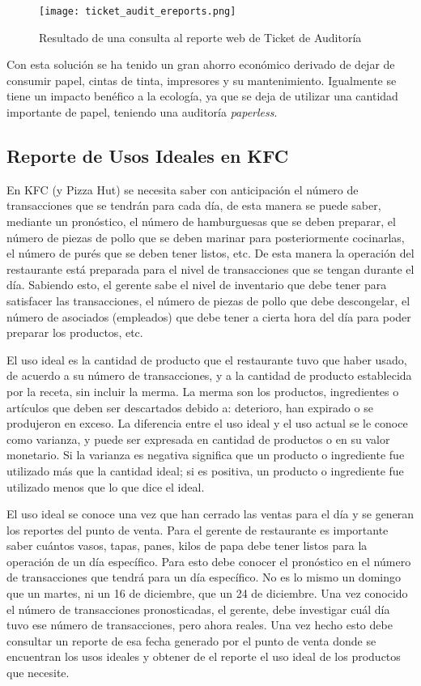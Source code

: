 \begin{figure}[htb]
 \begin{center}
  \texttt{[image: ticket\_audit\_ereports.png]}
 \end{center}
 \caption{Resultado de una consulta al reporte web de Ticket de Auditoría}
 \label{fig:rep_audit_ereports}
\end{figure}

Con esta solución se ha tenido un gran ahorro económico derivado de dejar de consumir papel, cintas de tinta, impresores y su mantenimiento. Igualmente se tiene un impacto benéfico a la ecología, ya que se deja de utilizar una cantidad importante de papel, teniendo una auditoría \textit{paperless}.

\subsection{Reporte de Usos Ideales en KFC}
\label{sec:usos_ideales_kfc}

En KFC (y Pizza Hut) se necesita saber con anticipación el número de transacciones que se tendrán para cada día, de esta manera se puede saber, mediante un pronóstico, el número de hamburguesas que se deben preparar, el número de piezas de pollo que se deben marinar para posteriormente cocinarlas, el número de purés que se deben tener listos, etc. De esta manera la operación del restaurante está preparada para el nivel de transacciones que se tengan durante el día. Sabiendo esto, el gerente sabe el nivel de inventario que debe tener para satisfacer las transacciones, el número de piezas de pollo que debe descongelar, el número de asociados (empleados) que debe tener a cierta hora del día para poder preparar los productos, etc. 

El uso ideal es la cantidad de producto que el restaurante tuvo que haber usado, de acuerdo a su número de transacciones, y a la cantidad de producto establecida por la receta, sin incluir la merma. La merma son los productos, ingredientes o artículos que deben ser descartados debido a: deterioro, han expirado o se produjeron en exceso. La diferencia entre el uso ideal y el uso actual se le conoce como varianza, y puede ser expresada en cantidad de productos o en su valor monetario. Si la varianza es negativa significa que un producto o ingrediente fue utilizado más que la cantidad ideal; si es positiva, un producto o ingrediente fue utilizado menos que lo que dice el ideal.

El uso ideal se conoce una vez que han cerrado las ventas para el día y se generan los reportes del punto de venta. Para el gerente de restaurante es importante saber cuántos vasos, tapas, panes, kilos de papa debe tener listos para la operación de un día específico. Para esto debe conocer el pronóstico en el número de transacciones que tendrá para un día específico. No es lo mismo un domingo que un martes, ni un 16 de diciembre, que un 24 de diciembre. Una vez conocido el número de transacciones pronosticadas, el gerente, debe investigar cuál día tuvo ese número de transacciones, pero ahora reales. Una vez hecho esto debe consultar un reporte de esa fecha generado por el punto de venta donde se encuentran los usos ideales y obtener de el reporte el uso ideal de los productos que necesite.

